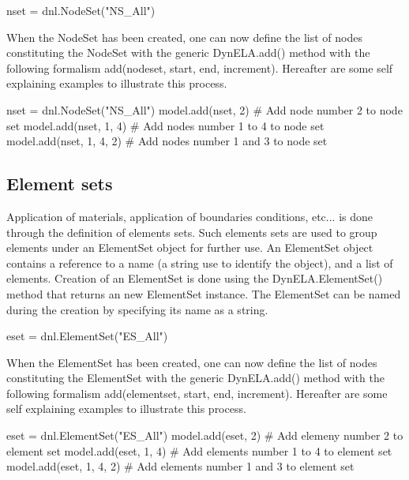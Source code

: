 \begin{PythonListing}
nset = dnl.NodeSet("NS_All")
\end{PythonListing}

When the \textsf{NodeSet} has been created, one can now define the
list of nodes constituting the \textsf{NodeSet} with the generic \textsf{DynELA.add()}
method with the following formalism \textsf{add(nodeset, start, end,
increment)}. Hereafter are some self explaining examples to illustrate
this process.

\begin{PythonListing}
nset = dnl.NodeSet("NS_All")
model.add(nset, 2)       # Add node number 2 to node set
model.add(nset, 1, 4)    # Add nodes number 1 to 4 to node set
model.add(nset, 1, 4, 2) # Add nodes number 1 and 3 to node set
\end{PythonListing}

\subsection{Element sets}

Application of materials, application of boundaries conditions, etc...
is done through the definition of elements sets. Such elements sets
are used to group elements under an \textsf{ElementSet} object for
further use. An \textsf{ElementSet} object contains a reference to
a name (a string use to identify the object), and a list of elements.
Creation of an \textsf{ElementSet} is done using the \textsf{DynELA.ElementSet()}
method that returns an new \textsf{ElementSet} instance. The \textsf{ElementSet}
can be named during the creation by specifying its name as a string.

\begin{PythonListing}
eset = dnl.ElementSet("ES_All")
\end{PythonListing}

When the \textsf{ElementSet} has been created, one can now define
the list of nodes constituting the \textsf{ElementSet} with the generic
\textsf{DynELA.add()} method with the following formalism \textsf{add(elementset,
start, end, increment)}. Hereafter are some self explaining examples
to illustrate this process.

\begin{PythonListing}
eset = dnl.ElementSet("ES_All")
model.add(eset, 2)       # Add elemeny number 2 to element set
model.add(eset, 1, 4)    # Add elements number 1 to 4 to element set
model.add(eset, 1, 4, 2) # Add elements number 1 and 3 to element set
\end{PythonListing}

